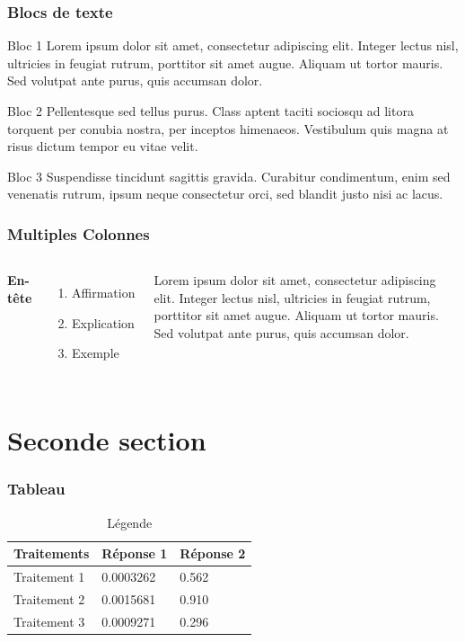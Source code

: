\documentclass{beamer}
\begin{document}
\begin{frame}
\frametitle{Blocs de texte}
\begin{block}{Bloc 1}
Lorem ipsum dolor sit amet, consectetur adipiscing elit. Integer lectus nisl, ultricies in feugiat rutrum, porttitor sit amet augue. Aliquam ut tortor mauris. Sed volutpat ante purus, quis accumsan dolor.
\end{block}

\begin{block}{Bloc 2}
Pellentesque sed tellus purus. Class aptent taciti sociosqu ad litora torquent per conubia nostra, per inceptos himenaeos. Vestibulum quis magna at risus dictum tempor eu vitae velit.
\end{block}

\begin{block}{Bloc 3}
Suspendisse tincidunt sagittis gravida. Curabitur condimentum, enim sed venenatis rutrum, ipsum neque consectetur orci, sed blandit justo nisi ac lacus.
\end{block}
\end{frame}

\begin{frame}
\frametitle{Multiples Colonnes}
\begin{columns}[c] %

\textbf{En-tête}
\begin{enumerate}
\item Affirmation
\item Explication
\item Exemple
\end{enumerate}

Lorem ipsum dolor sit amet, consectetur adipiscing elit. Integer lectus nisl, ultricies in feugiat rutrum, porttitor sit amet augue. Aliquam ut tortor mauris. Sed volutpat ante purus, quis accumsan dolor.

\end{columns}
\end{frame}

\section{Seconde section}

\begin{frame}
\frametitle{Tableau}
\begin{table}
\begin{tabular}{l l l}
\toprule
\textbf{Traitements} & \textbf{Réponse 1} & \textbf{Réponse 2}\\
\midrule
Traitement 1 & 0.0003262 & 0.562 \\
Traitement 2 & 0.0015681 & 0.910 \\
Traitement 3 & 0.0009271 & 0.296 \\
\bottomrule
\end{tabular}
\caption{Légende}
\end{table}
\end{frame}
\end{document}
